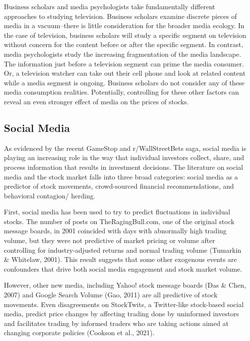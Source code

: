 \documentclass[12pt,]{article}
\begin{document}
Business scholars and media psychologists take fundamentally different
approaches to studying television. Business scholars examine discrete
pieces of media in a vacuum--there is little consideration for the
broader media ecology. In the case of television, business scholars will
study a specific segment on television without concern for the content
before or after the specific segment. In contrast, media psychologists
study the increasing fragmentation of the media landscape. The
information just before a television segment can prime the media
consumer. Or, a television watcher can take out their cell phone and
look at related content while a media segment is ongoing. Business
scholars do not consider any of these media consumption realities.
Potentially, controlling for these other factors can reveal an even
stronger effect of media on the prices of stocks.

\hypertarget{social-media}{%
\subsection{Social Media}\label{social-media}}

As evidenced by the recent GameStop and r/WallStreetBets saga, social
media is playing an increasing role in the way that individual investors
collect, share, and process information that results in investment
decisions. The literature on social media and the stock market falls
into three broad categories: social media as a predictor of stock
movements, crowd-sourced financial recommendations, and behavioral
contagion/ herding.

First, social media has been used to try to predict fluctuations in
individual stocks. The number of posts on TheRagingBull.com, one of the
original stock message boards, in 2001 coincided with days with
abnormally high trading volume, but they were not predictive of market
pricing or volume after controlling for industry-adjusted returns and
normal trading volume (Tumarkin \& Whitelaw, 2001). This result suggests
that some other exogenous events are confounders that drive both social
media engagement and stock market volume.

However, other new media, including Yahoo! stock message boards (Das \&
Chen, 2007) and Google Search Volume (Gao, 2011) are all predictive of
stock movements. Even disagreements on StockTwits, a Twitter-like
stock-based social media, predict price changes by affecting trading
done by uninformed investors and facilitates trading by informed traders
who are taking actions aimed at changing corporate policies (Cookson et
al., 2021).
\end{document}
